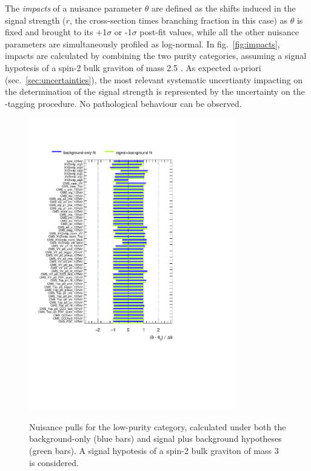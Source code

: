 \noindent The \emph{impacts} of a nuisance parameter $\theta$ are defined as the shifts induced in the signal strength ($r$, the cross-section times branching fraction in this case) as $\theta$ is fixed and brought to its +1$\sigma$ or -1$\sigma$ post-fit values, while all the other nuisance parameters are simultaneously profiled as log-normal. In fig.~\ref{fig:impacts}, impacts are calculated by combining the two purity categories, assuming a signal hypotesis of a spin-2 bulk graviton of mass 2.5 \TeV. As expected a-priori (sec.~\ref{sec:uncertainties}), the most relevant systematic uncertianty impacting on the determination of the signal strength is represented by the uncertainty on the \V-tagging procedure. No pathological behaviour can be observed. %

\begin{figure}[!h]
   \caption{Nuisance pulls for the low-purity category, calculated under both the background-only (blue bars) and signal plus background hypotheses (green bars). A signal hypotesis of a spin-2 bulk graviton of mass 3 \TeV is considered.}
 \begin{center}
   \includegraphics[width=0.8\textwidth]{pulls_VZ_data_1fb/pulls_XZZInv_lp3000.pdf}
   \label{fig:pulls_lp}
 \end{center}
\end{figure}

